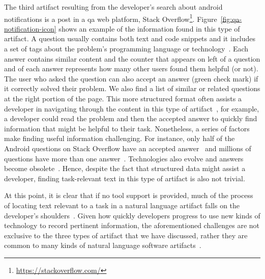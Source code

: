The third artifact resulting from the developer's search 
about android notifications 
is a post in a \acf{qa} web platform, Stack Overflow\footnote{\url{https://stackoverflow.com/}}.
Figure~\ref{fig:qa-notification-icon} shows an example of the information found in this type of artifact.
A question usually contains both text and code snippets
and it includes a set of tags  about the
problem's programming language or technology~\cite{Treude2011a}. 
Each answer contains similar content and 
the counter that appears on left of a question and of each answer
represents how many other users found them helpful (or not).
The user who asked the question can also accept an answer (green check mark)
if it correctly solved their problem.
We also find a list of similar or related questions 
at the right portion of the page. 
This more structured format often assists a developer 
in navigating through the content in this type of artifact~\cite{nadi2020}, for example, a developer could read the problem and 
then the accepted answer to quickly find information that might be helpful 
to their task. Nonetheless, a series of factors make finding useful information challenging. 
For instance, only half of the Android questions on Stack Overflow
have an accepted answer~\cite{parnin2012} 
and millions of questions have more than one answer~\cite{nadi2020}.
Technologies also evolve and answers become obsolete~\cite{Allamanis2013}.
Hence, despite the fact that structured data  might 
assist a developer, finding task-relevant text in this type of artifact is also not 
trivial.





At this point, it is clear that if no tool support is provided, much of the process of locating text 
relevant to a task in a natural language artifact falls on the developer's shoulders~\cite{gonccalves2011, Ko2006a, Bystrom1995}. Given how quickly developers progress to use new kinds of technology to
record pertinent information, the aforementioned challenges are not exclusive 
to the three types of artifact that we have discussed, rather 
they are common to many kinds of natural language software artifacts~\cite{Li2013, Starke2009}.




 
 